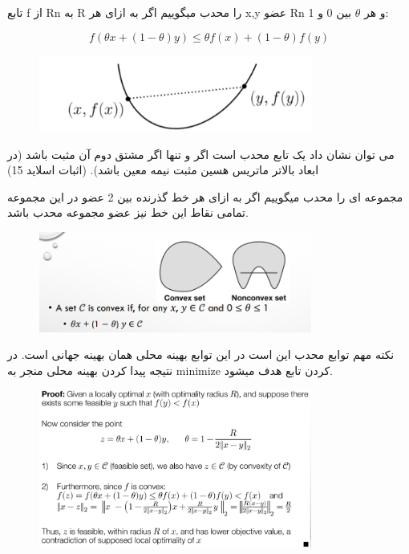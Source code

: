 \begin{flushright}
    تابع f از Rn به R را محدب میگوییم اگر به ازای هر x,y عضو Rn و هر $\theta$ بین 0 و 1:



    \begin{displaymath}
        f(\theta x + (1-\theta)y) \leq \theta f(x) + (1-\theta)f(y)
    \end{displaymath}

    \begin{figure}[H]
        \centering
        \includegraphics[width=0.8\textwidth]{source/convex-function.png}
        \label{fig:convex}
    \end{figure}


    می توان نشان داد یک تابع محدب است اگر و تنها اگر مشتق دوم آن مثبت باشد (در ابعاد بالاتر ماتریس هسین مثبت نیمه معین باشد). (اثبات اسلاید 15)

    مجموعه ای را محدب میگوییم اگر به ازای هر خط گذرنده بین 2 عضو در این مجموعه تمامی نقاط این خط نیز عضو مجموعه محدب باشد.
    \begin{figure}[H]
        \centering
        \includegraphics[width=0.8\textwidth]{source/convex-set.png}
        \label{fig:convex-set}
    \end{figure}

    نکته مهم توابع محدب این است در این توابع بهینه محلی همان بهینه جهانی است.
     در نتیجه پیدا کردن بهینه محلی منجر به minimize کردن تابع هدف میشود.

    \begin{figure}[H]
        \centering
        \includegraphics[width=0.8\textwidth]{source/global-min-in-convex.png}
        \label{fig:convex-example}
    \end{figure}

\end{flushright}